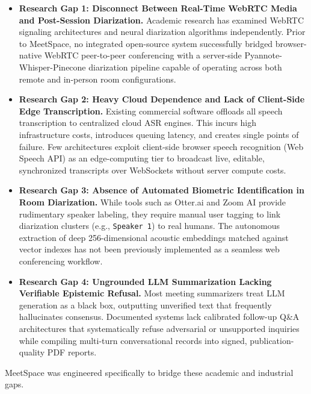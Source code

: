 \documentclass[12pt,oneside,letterpaper]{report}
\numberwithin{equation}{chapter} %
\begin{document}
\begin{itemize}
    \item \textbf{Research Gap 1: Disconnect Between Real-Time WebRTC Media and Post-Session Diarization.} Academic research has examined WebRTC signaling architectures and neural diarization algorithms independently. Prior to MeetSpace, no integrated open-source system successfully bridged browser-native WebRTC peer-to-peer conferencing with a server-side Pyannote-Whisper-Pinecone diarization pipeline capable of operating across both remote and in-person room configurations.
    
    \item \textbf{Research Gap 2: Heavy Cloud Dependence and Lack of Client-Side Edge Transcription.} Existing commercial software offloads all speech transcription to centralized cloud ASR engines. This incurs high infrastructure costs, introduces queuing latency, and creates single points of failure. Few architectures exploit client-side browser speech recognition (Web Speech API) as an edge-computing tier to broadcast live, editable, synchronized transcripts over WebSockets without server compute costs.
    
    \item \textbf{Research Gap 3: Absence of Automated Biometric Identification in Room Diarization.} While tools such as Otter.ai and Zoom AI provide rudimentary speaker labeling, they require manual user tagging to link diarization clusters (e.g., \texttt{Speaker 1}) to real humans. The autonomous extraction of deep 256-dimensional acoustic embeddings matched against vector indexes has not been previously implemented as a seamless web conferencing workflow.
    
    \item \textbf{Research Gap 4: Ungrounded LLM Summarization Lacking Verifiable Epistemic Refusal.} Most meeting summarizers treat LLM generation as a black box, outputting unverified text that frequently hallucinates consensus. Documented systems lack calibrated follow-up Q\&A architectures that systematically refuse adversarial or unsupported inquiries while compiling multi-turn conversational records into signed, publication-quality PDF reports.
\end{itemize}

MeetSpace was engineered specifically to bridge these academic and industrial gaps.

\end{document}
